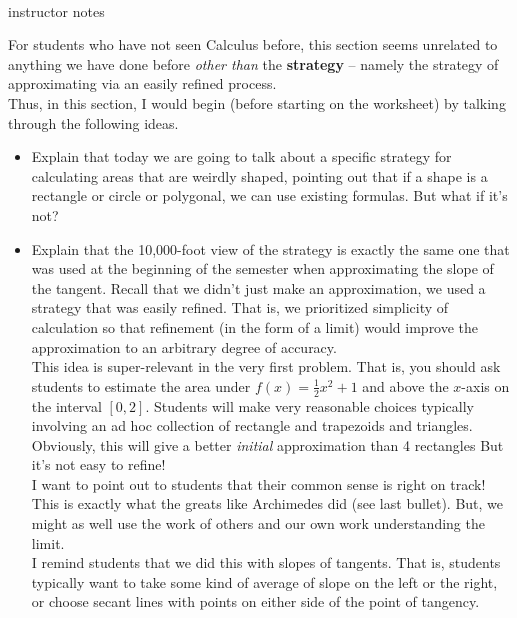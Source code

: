 \documentclass[11pt,fleqn]{article}
\begin{document}
\vspace*{-0.7in}

\begin{center}
  \Large{}\\
  instructor notes
  \end{center}

For students who have not seen Calculus before, this section seems unrelated to anything we have done before \emph{other than} the \textbf{strategy} -- namely the strategy of approximating via an easily refined process.\\

Thus, in this section, I would begin (before starting on the worksheet) by talking through the following ideas.

\begin{itemize}
\item Explain that today we are going to talk about a specific strategy for calculating areas that are weirdly shaped, pointing out that if a shape is a rectangle or circle or polygonal, we can use existing formulas. But what if it's not?
\item Explain that the 10,000-foot view of the strategy is exactly the same one that was used at the beginning of the semester when approximating the slope of the tangent. Recall that we didn't just make an approximation, we used a strategy that was easily refined. That is, we prioritized simplicity of calculation so that refinement (in the form of a limit) would improve the approximation to an arbitrary degree of accuracy. \\

This idea is super-relevant in the very first problem. That is, you should ask students to estimate the area under  $f(x) =\frac{1}{2}x^2+1$ and above the $x$-axis on the interval $[0,2].$ Students will make very reasonable choices typically involving an ad hoc collection of rectangle and trapezoids and triangles. Obviously, this will give a better \emph{initial} approximation than 4 rectangles But it's not easy to refine! \\

I want to point out to students that their common sense is right on track! This is exactly what the greats like Archimedes did (see last bullet). But, we might as well use the work of others and our own work understanding the limit.\\

I remind students that we did this with slopes of tangents. That is, students typically want to take some kind of average of slope on the left or the right, or choose secant lines with points on either side of the point of tangency.\\



\end{itemize}
\end{document}
